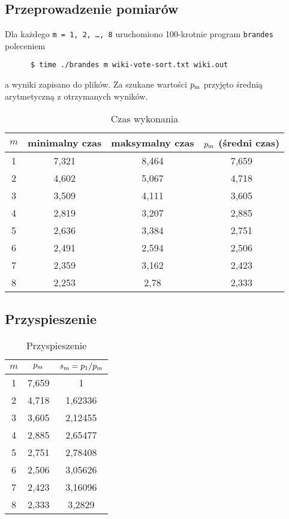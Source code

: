 \documentclass{article}
\begin{document}
    \subsection{Przeprowadzenie pomiarów}
    Dla każdego \texttt{m = 1, 2, \ldots, 8} uruchomiono 100-krotnie program
    \texttt{brandes} poleceniem
    \begin{verbatim}
      $ time ./brandes m wiki-vote-sort.txt wiki.out
    \end{verbatim}
    \vspace{-3ex}
    a wyniki zapisano do plików. Za szukane wartości $p\textsubscript{m}$ przyjęto
    średnią arytmetyczną z otrzymanych wyników.
    \begin{table}[h]
      \centering
      \label{tab:times}
      \begin{tabular}{|c|c|c|c|}
        \hline
        \bfseries $m$ & \bfseries minimalny czas & \bfseries maksymalny czas &
        \bfseries $p\textsubscript{m}$ (średni czas)\\
        \hline
        1 & 7,321     & 8,464      & 7,659   \\
        2 & 4,602     & 5,067      & 4,718   \\
        3 & 3,509     & 4,111      & 3,605   \\
        4 & 2,819     & 3,207      & 2,885   \\
        5 & 2,636     & 3,384      & 2,751   \\
        6 & 2,491     & 2,594      & 2,506   \\
        7 & 2,359     & 3,162      & 2,423   \\
        8 & 2,253     & 2,78       & 2,333   \\
        \hline
      \end{tabular}
      \caption{Czas wykonania}
    \end{table}
    \subsection{Przyspieszenie}
    \begin{table}[h]
      \centering
      \label{tab:speedup}
      \begin{tabular}{|c|c|c|}
        \hline
        \bfseries $m$ & \bfseries $p\textsubscript{m}$ & \bfseries
        $s\textsubscript{m} = p\textsubscript{1}/p\textsubscript{m}$ \\
        \hline
        1 & 7,659 & 1       \\
        2 & 4,718 & 1,62336 \\
        3 & 3,605 & 2,12455 \\
        4 & 2,885 & 2,65477 \\
        5 & 2,751 & 2,78408 \\
        6 & 2,506 & 3,05626 \\
        7 & 2,423 & 3,16096 \\
        8 & 2,333 & 3,2829  \\
        \hline
      \end{tabular}
      \caption{Przyspieszenie}
    \end{table}
\end{document}
